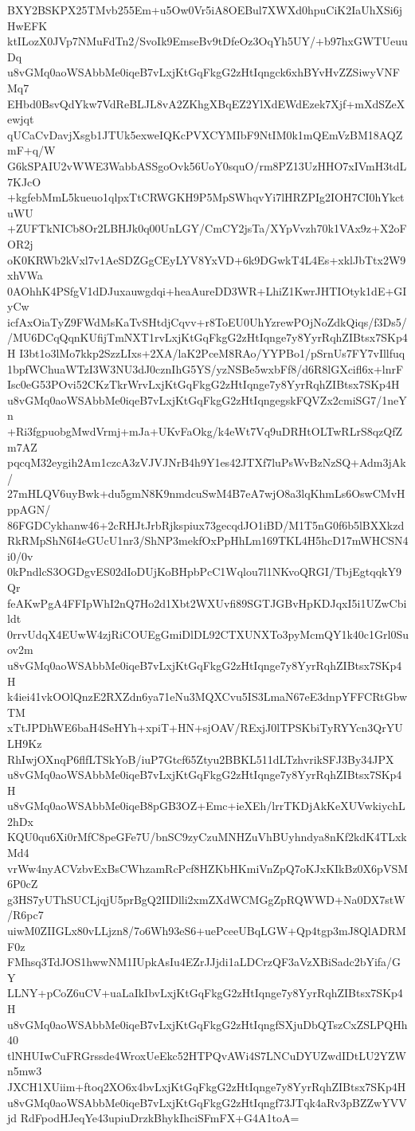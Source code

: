 BXY2BSKPX25TMvb255Em+u5Ow0Vr5iA8OEBul7XWXd0hpuCiK2IaUhXSi6jHwEFK
ktILozX0JVp7NMuFdTn2/SvoIk9EmseBv9tDfeOz3OqYh5UY/+b97hxGWTUeuuDq
u8vGMq0aoWSAbbMe0iqeB7vLxjKtGqFkgG2zHtIqngck6xhBYvHvZZSiwyVNFMq7
EHbd0BsvQdYkw7VdReBLJL8vA2ZKhgXBqEZ2YlXdEWdEzek7Xjf+mXdSZeXewjqt
qUCaCvDavjXsgb1JTUk5exweIQKcPVXCYMIbF9NtIM0k1mQEmVzBM18AQZmF+q/W
G6kSPAIU2vWWE3WabbASSgoOvk56UoY0squO/rm8PZ13UzHHO7xIVmH3tdL7KJcO
+kgfebMmL5kueuo1qlpxTtCRWGKH9P5MpSWhqvYi7lHRZPIg2IOH7CI0hYkctuWU
+ZUFTkNICb8Or2LBHJk0q00UnLGY/CmCY2jsTa/XYpVvzh70k1VAx9z+X2oFOR2j
oK0KRWb2kVxl7v1AeSDZGgCEyLYV8YxVD+6k9DGwkT4L4Es+xklJbTtx2W9xhVWa
0AOhhK4PSfgV1dDJuxauwgdqi+heaAureDD3WR+LhiZ1KwrJHTIOtyk1dE+GIyCw
icfAxOiaTyZ9FWdMsKaTvSHtdjCqvv+r8ToEU0UhYzrewPOjNoZdkQiqs/f3Ds5/
/MU6DCqQqnKUfijTmNXT1rvLxjKtGqFkgG2zHtIqnge7y8YyrRqhZIBtsx7SKp4H
I3bt1o3lMo7kkp2SzzLIxs+2XA/laK2PceM8RAo/YYPBo1/pSrnUs7FY7vIllfuq
1bpfWChuaWTzI3W3NU3dJ0cznIhG5YS/yzNSBe5wxbFf8/d6R8lGXcifl6x+lnrF
Isc0eG53POvi52CKzTkrWrvLxjKtGqFkgG2zHtIqnge7y8YyrRqhZIBtsx7SKp4H
u8vGMq0aoWSAbbMe0iqeB7vLxjKtGqFkgG2zHtIqngegskFQVZx2cmiSG7/1neYn
+Ri3fgpuobgMwdVrmj+mJa+UKvFaOkg/k4eWt7Vq9uDRHtOLTwRLrS8qzQfZm7AZ
pqcqM32eygih2Am1czcA3zVJVJNrB4h9Y1es42JTXf7luPsWvBzNzSQ+Adm3jAk/
27mHLQV6uyBwk+du5gmN8K9nmdcuSwM4B7eA7wjO8a3lqKhmLs6OswCMvHppAGN/
86FGDCykhanw46+2cRHJtJrbRjkspiux73gecqdJO1iBD/M1T5nG0f6b5lBXXkzd
RkRMpShN6I4eGUcU1nr3/ShNP3mekfOxPpHhLm169TKL4H5hcD17mWHCSN4i0/0v
0kPndlcS3OGDgvES02dIoDUjKoBHpbPcC1Wqlou7l1NKvoQRGI/TbjEgtqqkY9Qr
feAKwPgA4FFIpWhI2nQ7Ho2d1Xbt2WXUvfi89SGTJGBvHpKDJqxI5i1UZwCbildt
0rrvUdqX4EUwW4zjRiCOUEgGmiDlDL92CTXUNXTo3pyMcmQY1k40c1Grl0Suov2m
u8vGMq0aoWSAbbMe0iqeB7vLxjKtGqFkgG2zHtIqnge7y8YyrRqhZIBtsx7SKp4H
k4iei41vkOOlQnzE2RXZdn6ya71eNu3MQXCvu5IS3LmaN67eE3dnpYFFCRtGbwTM
xTtJPDhWE6baH4SeHYh+xpiT+HN+sjOAV/RExjJ0lTPSKbiTyRYYcn3QrYULH9Kz
RhIwjOXnqP6flfLTSkYoB/iuP7Gtcf65Ztyu2BBKL511dLTzhvrikSFJ3By34JPX
u8vGMq0aoWSAbbMe0iqeB7vLxjKtGqFkgG2zHtIqnge7y8YyrRqhZIBtsx7SKp4H
u8vGMq0aoWSAbbMe0iqeB8pGB3OZ+Emc+ieXEh/lrrTKDjAkKeXUVwkiychL2hDx
KQU0qu6Xi0rMfC8peGFe7U/bnSC9zyCzuMNHZuVhBUyhndya8nKf2kdK4TLxkMd4
vrWw4nyACVzbvExBsCWhzamRcPcf8HZKbHKmiVnZpQ7oKJxKIkBz0X6pVSM6P0cZ
g3HS7yUThSUCLjqjU5prBgQ2IIDlli2xmZXdWCMGgZpRQWWD+Na0DX7stW/R6pc7
uiwM0ZIIGLx80vLLjzn8/7o6Wh93eS6+uePceeUBqLGW+Qp4tgp3mJ8QlADRMF0z
FMhsq3TdJOS1hwwNM1IUpkAsIu4EZrJJjdi1aLDCrzQF3aVzXBiSadc2bYifa/GY
LLNY+pCoZ6uCV+uaLaIkIbvLxjKtGqFkgG2zHtIqnge7y8YyrRqhZIBtsx7SKp4H
u8vGMq0aoWSAbbMe0iqeB7vLxjKtGqFkgG2zHtIqngfSXjuDbQTszCxZSLPQHh40
tlNHUIwCuFRGrssde4WroxUeEkc52HTPQvAWi4S7LNCuDYUZwdIDtLU2YZWn5mw3
JXCH1XUiim+ftoq2XO6x4bvLxjKtGqFkgG2zHtIqnge7y8YyrRqhZIBtsx7SKp4H
u8vGMq0aoWSAbbMe0iqeB7vLxjKtGqFkgG2zHtIqngf73JTqk4aRv3pBZZwYVVjd
RdFpodHJeqYe43upiuDrzkBhykIhciSFmFX+G4A1toA=
